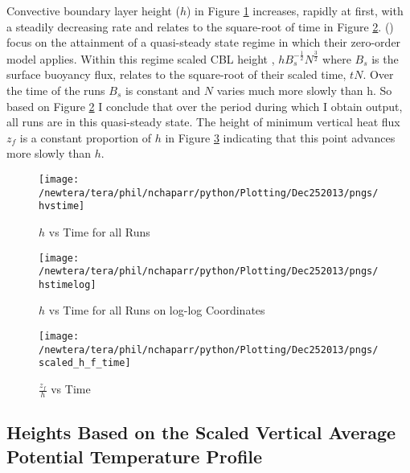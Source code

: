 Convective boundary layer height ($h$) in Figure \ref{fig:hvstime} increases, rapidly at first, with a steadily decreasing rate and relates to the square-root of time in Figure \ref{fig:loghvstime}.  \citeauthor{FedConzMir04} (\citeyear{FedConzMir04})
focus on the attainment of a quasi-steady state regime in which their zero-order model applies.  Within this regime scaled \acs{CBL} height , $hB_{s}^{-\frac{1}{2}}N^{\frac{3}{2}}$ where $B_{s}$ is the surface buoyancy flux, relates to the square-root of their scaled time, $tN$. Over the time of the runs $B_{s}$ is constant and $N$ varies much more slowly than h.  So based on Figure \ref{fig:loghvstime} I conclude that over the period during which I obtain output, all runs are in this quasi-steady state. The height of minimum vertical heat flux $z_{f}$ is a constant proportion of $h$ in Figure \ref{fig:zfvstime} indicating that this point advances more slowly than $h$.\\
  
\begin{figure}[htbp]
    \centering
    \texttt{[image: /newtera/tera/phil/nchaparr/python/Plotting/Dec252013/pngs/hvstime]}
    \caption{$h$ vs Time for all Runs}
    \label{fig:hvstime}   %
\end{figure}

\begin{figure}[htbp]
    \centering
    \texttt{[image: /newtera/tera/phil/nchaparr/python/Plotting/Dec252013/pngs/hstimelog]}
    \caption{$h$ vs Time for all Runs on log-log Coordinates}
    \label{fig:loghvstime}   %
\end{figure}


\begin{figure}[htbp]
    \centering
    \hspace{-5mm}\texttt{[image: /newtera/tera/phil/nchaparr/python/Plotting/Dec252013/pngs/scaled\_h\_f\_time]}
    \caption{$\frac{z_{f}}{h}$ vs Time}
    \label{fig:zfvstime}   %
\end{figure}

\clearpage

\subsection{Heights Based on the Scaled Vertical Average Potential Temperature Profile}
\label{subsec:thetari}

